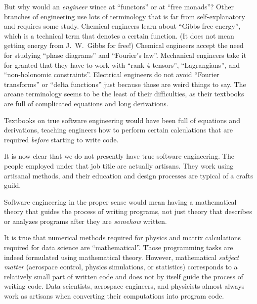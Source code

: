 But why would an \emph{engineer} wince at \textsf{``}functors\textsf{''} or at \textsf{``}free
monads\textsf{''}? Other branches of engineering use lots of terminology that
is far from self-explanatory and requires some study. Chemical engineers
learn about \textsf{``}Gibbs free energy\textsf{''}, which is a technical term that
denotes a certain function. (It does not mean getting
energy from J.~W.~Gibbs for free!)
Chemical engineers accept the need for studying \textsf{``}phase diagrams\textsf{''}
and \textsf{``}Fourier\textsf{'}s law\textsf{''}. Mechanical engineers take it for granted
that they have to work with \textsf{``}rank 4 tensors\textsf{''}, \textsf{``}Lagrangians\textsf{''},
and \textsf{``}non-holonomic constraints\textsf{''}. Electrical engineers do not avoid
\textsf{``}Fourier transforms\textsf{''} or \textsf{``}delta functions\textsf{''} just because those
are weird things to say. The arcane terminology seems to be the least
of their difficulties, as their textbooks are full of complicated
equations and long derivations.

Textbooks on true software engineering would have been full of equations
and derivations, teaching engineers how to perform certain calculations
that are required \emph{before} starting to write code.


It is now clear that we do not presently have true software engineering.
The people employed under that job title are actually artisans. They
work using artisanal methods, and their education and design processes
are typical of a crafts guild.

Software engineering in the proper sense would mean having a mathematical
theory that guides the process of writing programs, \textemdash{}
not just theory that describes or analyzes programs after they are
\emph{somehow} written.

It is true that numerical methods required for physics and matrix
calculations required for data science are \textsf{``}mathematical\textsf{''}. Those
programming tasks are indeed formulated using mathematical theory.
However, mathematical \emph{subject matter} (aerospace control, physics
simulations, or statistics) corresponds to a relatively small part
of written code and does not by itself guide the process of writing
code. Data scientists, aerospace engineers, and physicists almost
always work as artisans when converting their computations into program
code.

